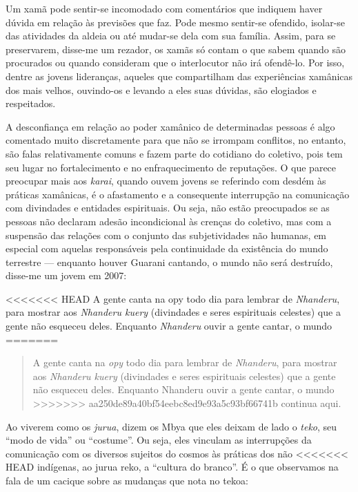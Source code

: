 Um xamã pode sentir-se incomodado com comentários que indiquem haver
dúvida em relação às previsões que faz. Pode mesmo sentir-se ofendido,
isolar-se das atividades da aldeia ou até mudar-se dela com sua
família. Assim, para se preservarem, disse-me um rezador, os xamãs só
contam o que sabem quando são procurados ou quando consideram que o
interlocutor não irá ofendê-lo. Por isso, dentre as jovens lideranças,
aqueles que compartilham das experiências xamânicas dos mais velhos,
ouvindo-os e levando a eles suas dúvidas, são elogiados e respeitados.

A desconfiança em relação ao poder xamânico de determinadas pessoas é
algo comentado muito discretamente para que não se irrompam conflitos,
no entanto, são falas relativamente comuns e fazem parte do cotidiano
do coletivo, pois tem seu lugar no fortalecimento e no enfraquecimento
de reputações. O que parece preocupar mais aos \emph{karai}, quando ouvem
jovens se referindo com desdém às práticas xamânicas, é o afastamento e
a consequente interrupção na comunicação com divindades e entidades
espirituais. Ou seja, não estão preocupados se as pessoas não declaram
adesão incondicional às crenças do coletivo, mas com a suspensão das
relações com o conjunto das subjetividades não humanas, em especial com
aquelas responsáveis pela continuidade da existência do mundo terrestre
--- enquanto houver Guarani cantando, o mundo não será destruído,
disse-me um jovem em 2007: 

<<<<<<< HEAD
A gente canta na opy todo dia para lembrar de \emph{Nhanderu}, para mostrar aos
\emph{Nhanderu kuery} (divindades e seres espirituais celestes) que a gente
não esqueceu deles. Enquanto \emph{Nhanderu} ouvir a gente cantar, o mundo
=======
\begin{quote}
A gente canta na \emph{opy} todo dia para lembrar de \emph{Nhanderu}, para mostrar aos
\emph{Nhanderu kuery} (divindades e seres espirituais celestes) que a gente
não esqueceu deles. Enquanto Nhanderu ouvir a gente cantar, o mundo
>>>>>>> aa250de89a40bf54eebc8ed9e93a5c93bf66741b
continua aqui.
\end{quote}

Ao viverem como os \emph{jurua}, dizem os Mbya que eles deixam de lado o \emph{teko},
seu ``modo de vida'' ou ``costume''. Ou seja, eles vinculam as interrupções
da comunicação com os diversos sujeitos do cosmos às práticas dos não
<<<<<<< HEAD
indígenas, ao jurua reko, a ``cultura do branco''. É o que observamos na
fala de um cacique sobre as mudanças que nota no tekoa:

